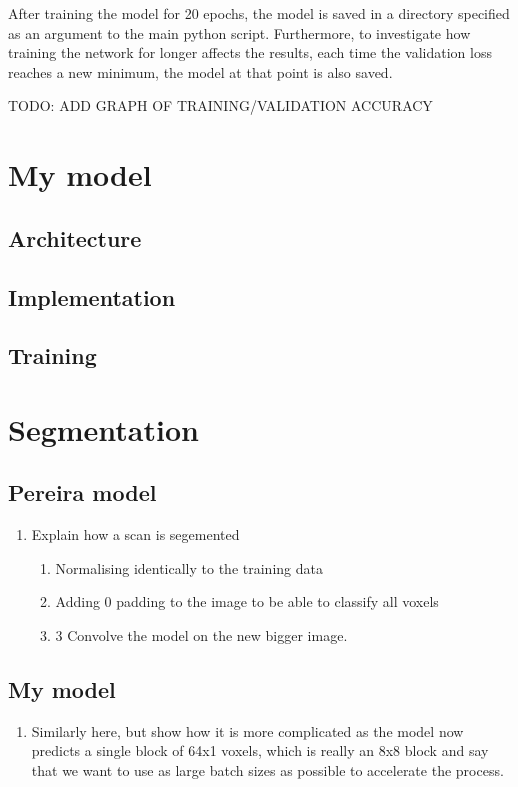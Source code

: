 \documentclass[12pt,a4paper,twoside,openright]{report}
\begin{document}
After training the model for 20 epochs, the model is saved in a directory specified as an argument to the main python script. Furthermore, to investigate how training the network for longer affects the results, each time the validation loss reaches a new minimum, the model at that point is also saved.

TODO: ADD GRAPH OF TRAINING/VALIDATION ACCURACY
\section{My model}
\subsection{Architecture}
\subsection{Implementation}
\subsection{Training}

\section{Segmentation}
\subsection{Pereira model}
\begin{enumerate}
	\item Explain how a scan is segemented 
	\begin{enumerate}
		\item  Normalising identically to the training data
		\item Adding 0 padding to the image to be able to classify all voxels
		\item 3 Convolve the model on the new bigger image.
	\end{enumerate}
\end{enumerate}
\subsection{My model}
\begin{enumerate}
	\item Similarly here, but show how it is more complicated as the model now predicts a single block of 64x1 voxels, which is really an 8x8 block and say that we want to use as large batch sizes as possible to accelerate the process.
\end{enumerate}
\end{document}
